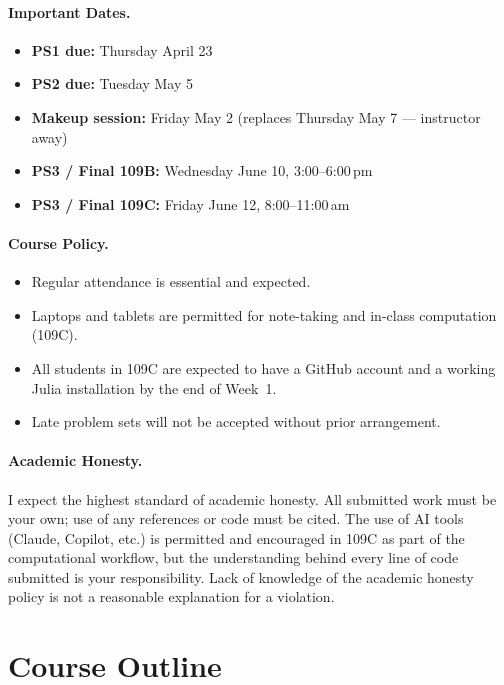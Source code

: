 \paragraph{Important Dates.}
\begin{itemize}
    \item \textbf{PS1 due:} Thursday April 23
    \item \textbf{PS2 due:} Tuesday May 5
    \item \textbf{Makeup session:} Friday May 2 (replaces Thursday May 7 --- instructor away)
    \item \textbf{PS3 / Final 109B:} Wednesday June 10, 3:00--6:00\,pm
    \item \textbf{PS3 / Final 109C:} Friday June 12, 8:00--11:00\,am
\end{itemize}

\paragraph{Course Policy.}
\begin{itemize}
    \item Regular attendance is essential and expected.
    \item Laptops and tablets are permitted for note-taking and in-class computation (109C).
    \item All students in 109C are expected to have a GitHub account and a working Julia installation by the end of Week~1.
    \item Late problem sets will not be accepted without prior arrangement.
\end{itemize}

\paragraph{Academic Honesty.}
I expect the highest standard of academic honesty.
All submitted work must be your own; use of any references or code must be cited.
The use of AI tools (Claude, Copilot, etc.) is permitted and encouraged in 109C as part of the computational workflow, but the understanding behind every line of code submitted is your responsibility.
Lack of knowledge of the academic honesty policy is not a reasonable explanation for a violation.
\section*{Course Outline}

